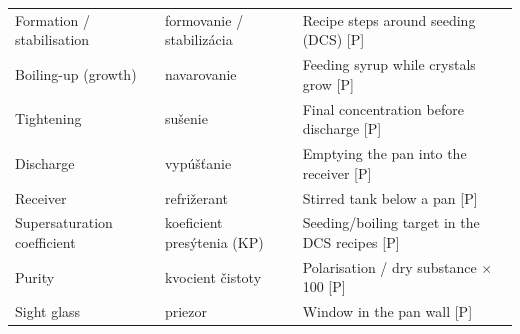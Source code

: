 \begin{table}[!ht]
\begin{tabular}{@{}>{\raggedright\arraybackslash}p{}>{\raggedright\arraybackslash}p{}%
>{\raggedright\arraybackslash}p{}@{}}
Formation / stabilisation & formovanie / stabiliz\'acia & Recipe steps around seeding (DCS) [P] \\
Boiling-up (growth) & navarovanie & Feeding syrup while crystals grow [P] \\
Tightening & su\v{s}enie & Final concentration before discharge [P] \\
Discharge & vyp\'u\v{s}\v{t}anie & Emptying the pan into the receiver [P] \\
Receiver & refri\v{z}erant & Stirred tank below a pan [P] \\
Super\-saturation coefficient & koeficient pres\'ytenia (KP) & Seeding/boiling target in the DCS recipes [P] \\
Purity & kvocient \v{c}istoty & Polarisation / dry substance $\times$ 100 [P] \\
Sight glass & priezor & Window in the pan wall [P] \\
\bottomrule
\end{tabular}
\end{table}

